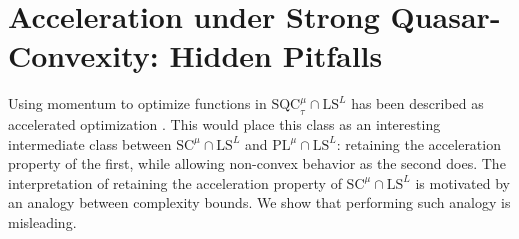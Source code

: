 \documentclass{article}
\def\pl{{\text{PL}^\mu}}
\newcommand{\sqc}{\text{SQC}_{\tau}^{\mu}}
\newcommand{\ls}{\text{LS}^{L}}
\newcommand{\strongconv}{\text{SC}^{\mu}}
\theoremstyle{plain}
\theoremstyle{definition}
\theoremstyle{remark}
\begin{document}
\section{Acceleration under Strong Quasar-Convexity: Hidden Pitfalls}\label{sec:sqc_pitfalls}
Using momentum to optimize functions in $\sqc \cap \ls$ has been described as accelerated optimization \cite{hinder2020near,fu2023accelerated,hermant2024study}. This would place this class as an interesting intermediate class between $\strongconv \cap \ls$ and $\pl \cap \ls$: retaining the acceleration property of the first, while allowing non-convex behavior as the second does. 
The interpretation of retaining the acceleration property of  $\strongconv \cap \ls$ is
motivated by an analogy between complexity bounds. We show that performing such analogy is misleading. 
\end{document}
